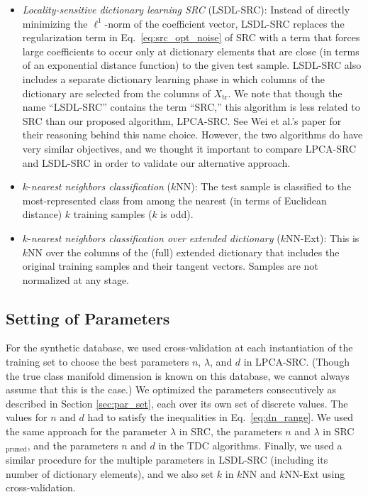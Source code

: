 \documentclass[review]{elsarticle}
\begin{document}
\begin{itemize}[noitemsep,nolistsep]
\item \textit{Locality-sensitive dictionary learning SRC} (LSDL-SRC): Instead of directly minimizing the $\ell^1$-norm of the coefficient vector, LSDL-SRC replaces the regularization term in Eq.~\eqref{eq:src_opt_noise} of SRC with a term that forces large coefficients to occur only at dictionary elements that are close (in terms of an exponential distance function) to the given test sample. LSDL-SRC also includes a separate dictionary learning phase in which columns of the dictionary are selected from the columns of $X_\mathrm{tr}$. We note that though the name ``LSDL-SRC'' contains the term ``SRC,'' this algorithm is less related to SRC than our proposed algorithm, LPCA-SRC. See Wei et al.'s paper \cite{wei:lsdl} for their reasoning behind this name choice. However, the two algorithms do have very similar objectives, and we thought it important to compare LPCA-SRC and LSDL-SRC in order to validate our alternative approach.


\item $\mathit{k}$-\textit{nearest neighbors classification} ($k$NN): The test sample is classified to the most-represented class from among the nearest (in terms of Euclidean distance) $k$ training samples ($k$ is odd).

\item $\mathit{k}$-\textit{nearest neighbors classification over extended dictionary} ($k$NN-Ext): This is $k$NN over the columns of the (full) extended dictionary that includes the original training samples and their tangent vectors. Samples are not normalized at any stage. 

\end{itemize}



\subsection{Setting of Parameters}

For the synthetic database, we used cross-validation at each instantiation of the training set to choose the best parameters $n$, $\lambda$, and $d$ in LPCA-SRC. (Though the true class manifold dimension is known on this database, we cannot always assume that this is the case.) We optimized the parameters consecutively as described in Section \ref{sec:par_set}, each over its own set of discrete values. The values for $n$ and $d$ had to satisfy the inequalities in Eq.~\eqref{eq:dn_range}. We used the same approach for the parameter $\lambda$ in SRC, the parameters $n$ and $\lambda$ in SRC$_\mathrm{pruned}$, and the parameters $n$ and $d$ in the TDC algorithms. Finally, we used a similar procedure for the multiple parameters in LSDL-SRC (including its number of dictionary elements), and we also set $k$ in $k$NN and $k$NN-Ext using cross-validation. 
\end{document}
